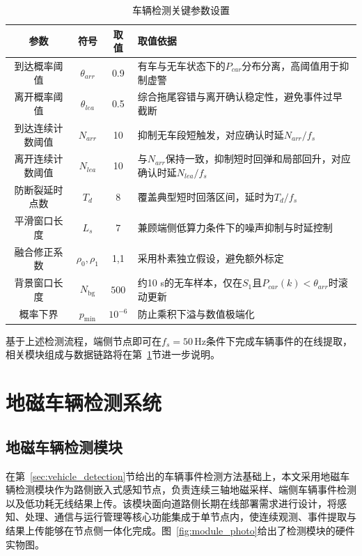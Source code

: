 \documentclass{xdupgthesis}
\makeatletter
\newcommand{\Fs}{\ensuremath{50\,\mathrm{Hz}}}
\newcommand{\SmoothLen}{\ensuremath{7}}        %
\newcommand{\BgWinPts}{\ensuremath{500}}       %
\newcommand{\ProbFloor}{\ensuremath{10^{-6}}}  %
\providecommand{\FloatBarrier}{}
\makeatother
\begin{document}
\begin{table}[!htbp]
    \centering
    \caption{车辆检测关键参数设置}
    \label{tab:det_param}
    \begin{tabular}{c c c C{6.4cm}}
        \toprule
        参数 & 符号 & 取值 & 取值依据 \\
        \midrule
        到达概率阈值 & $\theta_{arr}$ & 0.9 & 有车与无车状态下的$P_{car}$分布分离，高阈值用于抑制虚警 \\
        离开概率阈值 & $\theta_{lea}$ & 0.5 & 综合拖尾容错与离开确认稳定性，避免事件过早截断 \\
        到达连续计数阈值 & $N_{arr}$ & 10 & 抑制无车段短触发，对应确认时延$N_{arr}/f_s$ \\
        离开连续计数阈值 & $N_{lea}$ & 10 & 与$N_{arr}$保持一致，抑制短时回弹和局部回升，对应确认时延$N_{lea}/f_s$ \\
        防断裂延时点数 & $T_d$ & 8 & 覆盖典型短时回落区间，延时为$T_d/f_s$ \\
        \addlinespace[2pt]
        平滑窗口长度 & $L_s$ & \SmoothLen & 兼顾端侧低算力条件下的噪声抑制与时延控制 \\
        融合修正系数 & $\rho_0,\rho_1$ & 1,1 & 采用朴素独立假设，避免额外标定 \\
        背景窗口长度 & $N_{\mathrm{bg}}$ & \BgWinPts & 约10 s的无车样本，仅在$S_1$且$P_{car}(k)<\theta_{arr}$时滚动更新 \\
        概率下界 & $p_{\min}$ & \ProbFloor & 防止乘积下溢与数值极端化 \\
        \bottomrule
    \end{tabular}
\end{table}

基于上述检测流程，端侧节点即可在$f_s=\Fs$条件下完成车辆事件的在线提取，相关模块组成与数据链路将在第~\ref{sec:ch2_system}节进一步说明。

\FloatBarrier

\section{地磁车辆检测系统}
\label{sec:ch2_system}

\subsection{地磁车辆检测模块}
\label{sec:ch2_module}

在第~\ref{sec:vehicle_detection}节给出的车辆事件检测方法基础上，本文采用地磁车辆检测模块作为路侧嵌入式感知节点，负责连续三轴地磁采样、端侧车辆事件检测以及低功耗无线结果上传。该模块面向道路侧长期在线部署需求进行设计，将感知、处理、通信与运行管理等核心功能集成于单节点内，使连续观测、事件提取与结果上传能够在节点侧一体化完成。图~\ref{fig:module_photo}给出了检测模块的硬件实物图。
\end{document}
